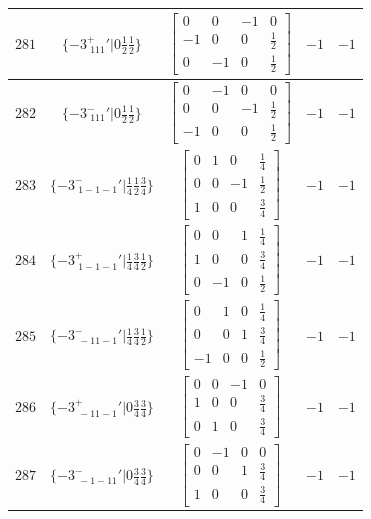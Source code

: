 \documentclass[fleqn,8pt]{jsarticle}
\begin{document}
\begin{longtable}{ccccc}
$ 281 $ & $ \{-3^{+}_{\,\,111}{}'|0 \frac{1}{2} \frac{1}{2}\} $ & $ \begin{bmatrix} 0 & 0 & -1 & 0 \\ -1 & 0 & 0 & \frac{1}{2} \\ 0 & -1 & 0 & \frac{1}{2} \end{bmatrix} $ & $ -1 $ & $ -1 $ \\ \hline
$ 282 $ & $ \{-3^{-}_{\,\,111}{}'|0 \frac{1}{2} \frac{1}{2}\} $ & $ \begin{bmatrix} 0 & -1 & 0 & 0 \\ 0 & 0 & -1 & \frac{1}{2} \\ -1 & 0 & 0 & \frac{1}{2} \end{bmatrix} $ & $ -1 $ & $ -1 $ \\ \hline
$ 283 $ & $ \{-3^{-}_{\,\,1-1-1}{}'|\frac{1}{4} \frac{1}{2} \frac{3}{4}\} $ & $ \begin{bmatrix} 0 & 1 & 0 & \frac{1}{4} \\ 0 & 0 & -1 & \frac{1}{2} \\ 1 & 0 & 0 & \frac{3}{4} \end{bmatrix} $ & $ -1 $ & $ -1 $ \\ \hline
$ 284 $ & $ \{-3^{+}_{\,\,1-1-1}{}'|\frac{1}{4} \frac{3}{4} \frac{1}{2}\} $ & $ \begin{bmatrix} 0 & 0 & 1 & \frac{1}{4} \\ 1 & 0 & 0 & \frac{3}{4} \\ 0 & -1 & 0 & \frac{1}{2} \end{bmatrix} $ & $ -1 $ & $ -1 $ \\ \hline
$ 285 $ & $ \{-3^{-}_{\,\,-11-1}{}'|\frac{1}{4} \frac{3}{4} \frac{1}{2}\} $ & $ \begin{bmatrix} 0 & 1 & 0 & \frac{1}{4} \\ 0 & 0 & 1 & \frac{3}{4} \\ -1 & 0 & 0 & \frac{1}{2} \end{bmatrix} $ & $ -1 $ & $ -1 $ \\ \hline
$ 286 $ & $ \{-3^{+}_{\,\,-11-1}{}'|0 \frac{3}{4} \frac{3}{4}\} $ & $ \begin{bmatrix} 0 & 0 & -1 & 0 \\ 1 & 0 & 0 & \frac{3}{4} \\ 0 & 1 & 0 & \frac{3}{4} \end{bmatrix} $ & $ -1 $ & $ -1 $ \\ \hline
$ 287 $ & $ \{-3^{-}_{\,\,-1-11}{}'|0 \frac{3}{4} \frac{3}{4}\} $ & $ \begin{bmatrix} 0 & -1 & 0 & 0 \\ 0 & 0 & 1 & \frac{3}{4} \\ 1 & 0 & 0 & \frac{3}{4} \end{bmatrix} $ & $ -1 $ & $ -1 $ \\ \hline

\end{longtable}
\end{document}
